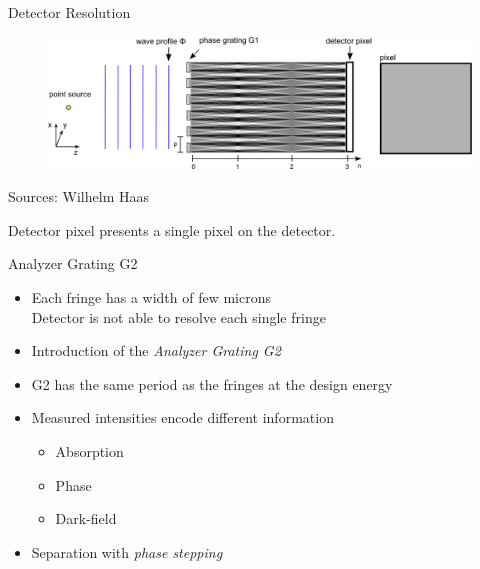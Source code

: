\begin{frame}[c]{Detector Resolution}
    \begin{figure}
        \includegraphics[width=\linewidth]{images/detector.eps}
    \end{figure}
    \begin{flushright}
        \scriptsize Sources: Wilhelm Haas
    \end{flushright}
    Detector pixel presents a single pixel on the detector.
\end{frame}

\begin{frame}[c]{Analyzer Grating G2}
    \begin{itemize}
        \setlength\itemsep{0.3cm}
        \item Each fringe has a width of few microns\\
              \bluefat{$\Rightarrow$} Detector is not able to resolve each single fringe

    \end{itemize}
    \vspace{0.5cm}

    \begin{itemize}
        \item Introduction of the \textit{Analyzer Grating G2}
        \item G2 has the same period as the fringes at the design energy
        \item Measured intensities encode different information
              \begin{itemize}
                  \item Absorption
                  \item Phase
                  \item Dark-field
              \end{itemize}
        \item Separation with \textit{phase stepping}
    \end{itemize}
\end{frame}

